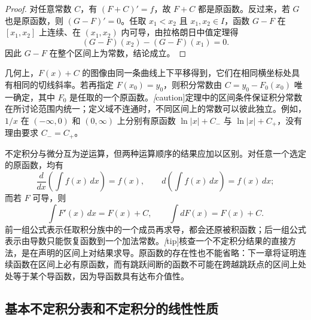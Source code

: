 \documentclass[UTF8,12pt,a4paper,fontset=fandol]{ctexbook}
\begin{document}
\begin{proof}
对任意常数 $C$，有 $(F+C)'=f$，故 $F+C$ 都是原函数。反过来，若 $G$ 也是原函数，则 $(G-F)'=0$。任取 $x_1<x_2$ 且 $x_1,x_2\in I$，函数 $G-F$ 在 $[x_1,x_2]$ 上连续、在 $(x_1,x_2)$ 内可导，由拉格朗日中值定理得
\[
    (G-F)(x_2)-(G-F)(x_1)=0.
\]
因此 $G-F$ 在整个区间上为常数，结论成立。
\end{proof}

几何上，$F(x)+C$ 的图像由同一条曲线上下平移得到，它们在相同横坐标处具有相同的切线斜率。若再指定 $F(x_0)=y_0$，则积分常数由 $C=y_0-F_0(x_0)$ 唯一确定，其中 $F_0$ 是任取的一个原函数。\emph[caution]{定理中的区间条件保证积分常数在所讨论范围内统一；定义域不连通时，不同区间上的常数可以彼此独立。}例如，$1/x$ 在 $(-\infty,0)$ 和 $(0,\infty)$ 上分别有原函数 $\ln|x|+C_-$ 与 $\ln|x|+C_+$，没有理由要求 $C_-=C_+$。

不定积分与微分互为逆运算，但两种运算顺序的结果应加以区别。对任意一个选定的原函数，均有
\[
    \frac{d}{dx}\left(\int f(x)\,dx\right)=f(x),
    \qquad d\left(\int f(x)\,dx\right)=f(x)\,dx;
\]
而若 $F$ 可导，则
\[
    \int F'(x)\,dx=F(x)+C,
    \qquad \int dF(x)=F(x)+C.
\]
前一组公式表示任取积分族中的一个成员再求导，都会还原被积函数；后一组公式表示由导数只能恢复函数到一个加法常数。\emph[tip]{核查一个不定积分结果的直接方法，是在声明的区间上对结果求导。}原函数的存在性也不能省略：下一章将证明连续函数在区间上必有原函数，而有跳跃间断的函数不可能在跨越跳跃点的区间上处处等于某个导函数，因为导函数具有达布介值性。

\subsection{基本不定积分表和不定积分的线性性质}
\label{subsec:basic-integrals-and-linearity}
\end{document}
